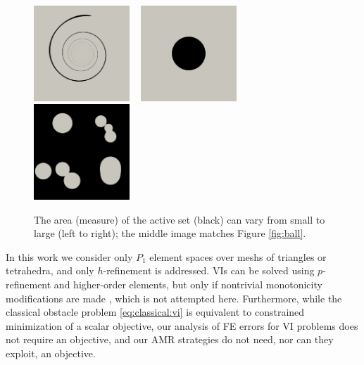 \documentclass[]{interact}
\theoremstyle{plain}%
\theoremstyle{definition}
\theoremstyle{remark}
\begin{document}
\begin{figure}[ht]
\noindent \hspace{-1mm} \mbox{\includegraphics[width=0.32\textwidth]{static/spiral.png} \, \includegraphics[width=0.32\textwidth]{static/sphere.png} \, \includegraphics[width=0.32\textwidth]{static/blisters.png}}
\caption{The area (measure) of the active set (black) can vary from small to large (left to right); the middle image matches Figure \ref{fig:ball}.}
\label{fig:activesizes}
\end{figure}

In this work we consider only $P_1$ element spaces over meshs of triangles or tetrahedra, and only $h$-refinement is addressed.  VIs can be solved using $p$-refinement and higher-order elements, but only if nontrivial monotonicity modifications are made \cite{KeithSurowiec2024}, which is not attempted here.  Furthermore, while the classical obstacle problem \eqref{eq:classical:vi} is equivalent to constrained minimization of a scalar objective, our analysis of FE errors for VI problems does not require an objective, and our AMR strategies do not need, nor can they exploit, an objective.
\end{document}
